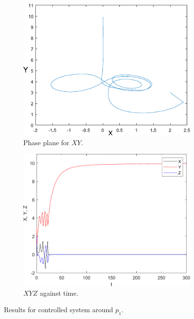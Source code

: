 \begin{figure}[H]
  \centering
  \begin{subfigure}[H]{0.4\textwidth}
    \includegraphics[scale = 0.75]{files/ctrlxvsYFixed0_9.pdf}
    \centering
    \caption{Phase plane for $XY$.}
    \label{fig:p1fixedxy}
  \end{subfigure}
  \hspace{1cm}
  \begin{subfigure}[H]{0.4\textwidth}
    \includegraphics[scale = 0.5]{files/ctrlq0_9.pdf}
    \centering
    \caption{$XYZ$ against time.}
    \label{fig:p1fixedxyz}
  \end{subfigure}
  \caption{Results for controlled system around $p_1$.}
  \label{img:p1}
\end{figure}
